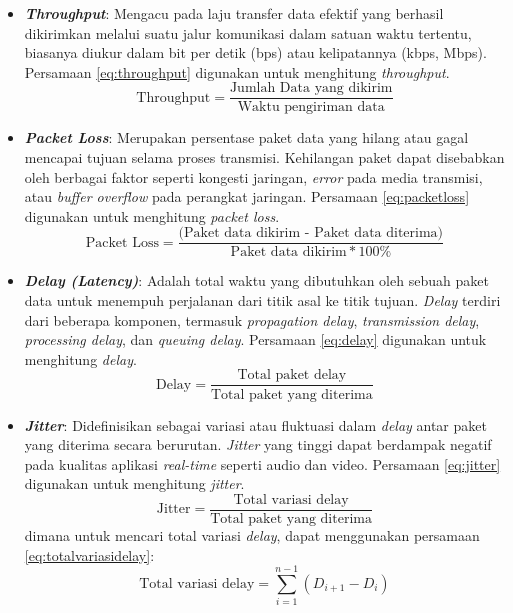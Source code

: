 \begin{itemize}
    \item \textbf{\emph{Throughput}}: Mengacu pada laju transfer data efektif yang berhasil dikirimkan melalui suatu jalur komunikasi dalam satuan waktu tertentu, biasanya diukur dalam bit per detik (bps) atau kelipatannya (kbps, Mbps). Persamaan \ref{eq:throughput} digunakan untuk menghitung \emph{throughput}.
    \begin{equation}
      \label{eq:throughput}
      \mbox{Throughput} = \frac{\mbox{Jumlah Data yang dikirim}}{\mbox{Waktu pengiriman data}}
    \end{equation}
    \item \textbf{\emph{Packet Loss}}: Merupakan persentase paket data yang hilang atau gagal mencapai tujuan selama proses transmisi. Kehilangan paket dapat disebabkan oleh berbagai faktor seperti kongesti jaringan, \emph{error} pada media transmisi, atau \emph{buffer overflow} pada perangkat jaringan. Persamaan \ref{eq:packetloss} digunakan untuk menghitung \emph{packet loss}.
    \begin{equation}
      \label{eq:packetloss}
      \mbox{Packet Loss} = \frac{\mbox{(Paket data dikirim - Paket data diterima)}}{\mbox{Paket data dikirim} * 100\%}
    \end{equation}
    \item \textbf{\emph{Delay (Latency)}}: Adalah total waktu yang dibutuhkan oleh sebuah paket data untuk menempuh perjalanan dari titik asal ke titik tujuan. \emph{Delay} terdiri dari beberapa komponen, termasuk \emph{\emph{propagation delay}}, \emph{\emph{transmission delay}}, \emph{\emph{processing delay}}, dan \emph{\emph{queuing delay}}. Persamaan \ref{eq:delay} digunakan untuk menghitung \emph{delay}.
    \begin{equation}
      \label{eq:delay}
      \mbox{Delay} = \frac{\mbox{Total paket delay}}{\mbox{Total paket yang diterima}}
    \end{equation}
    \item \textbf{\emph{Jitter}}: Didefinisikan sebagai variasi atau fluktuasi dalam \emph{delay} antar paket yang diterima secara berurutan. \emph{Jitter} yang tinggi dapat berdampak negatif pada kualitas aplikasi \emph{real-time} seperti audio dan video. Persamaan \ref{eq:jitter} digunakan untuk menghitung \emph{jitter}.
    \begin{equation}
      \label{eq:jitter}
      \mbox{Jitter} = \frac{\mbox{Total variasi delay}}{\mbox{Total paket yang diterima}}
    \end{equation}
    dimana untuk mencari total variasi \emph{delay}, dapat menggunakan persamaan \ref{eq:totalvariasidelay}:
    \begin{equation}
      \label{eq:totalvariasidelay}
      \mbox{Total variasi delay} = \sum_{i=1}^{n-1} (D_{i+1} - D_i)
    \end{equation}
\end{itemize}

